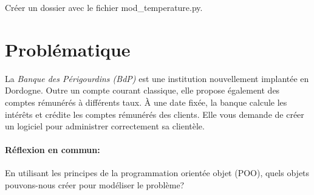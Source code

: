 \documentclass[a4paper,11pt]{article}
\begin{document}
\begin{Form}
\begin{commentprof}
Créer un dossier avec le fichier mod\_temperature.py.
\end{commentprof}
\section{Problématique}
La \emph{Banque des Périgourdins (BdP)} est une institution nouvellement implantée en Dordogne. Outre un compte courant classique, elle propose également des comptes rémunérés à différents taux. À une date fixée, la banque calcule les intérêts et crédite les comptes rémunérés des clients. Elle vous demande de créer un logiciel pour administrer correctement sa clientèle.
\paragraph{Réflexion en commun:} En utilisant les principes de la programmation orientée objet (POO), quels objets pouvons-nous créer pour modéliser le problème?

\end{Form}
\end{document}
